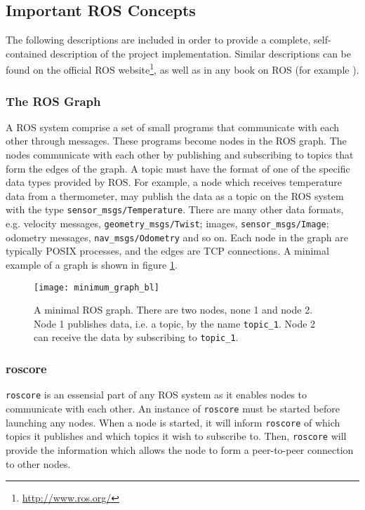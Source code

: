 \subsection{Important ROS Concepts}

The following descriptions are included in order to provide a complete, self-contained description of the project implementation. Similar descriptions can be found on the official \ac{ROS} website\footnote{\url{http://www.ros.org/}}, as well as in any book on \ac{ROS} (for example \cite{rosbook15}). 

\subsubsection{The ROS Graph}

A \ac{ROS} system comprise a set of small programs that communicate with each other through messages. These programs become nodes in the \ac{ROS} graph. The nodes communicate with each other by publishing and subscribing to topics that form the edges of the graph. A topic must have the format of one of the specific data types provided by \ac{ROS}. For example, a node which receives temperature data from a thermometer, may publish the data as a topic on the \ac{ROS} system with the type \texttt{sensor\_msgs/Temperature}. There are many other data formats, e.g. velocity messages, \texttt{geometry\_msgs/Twist}; images, \texttt{sensor\_msgs/Image}; odometry messages, \texttt{nav\_msgs/Odometry} and so on. Each node in the graph are typically POSIX processes, and the edges are TCP connections\cite{rosbook15}. A minimal example of a graph is shown in figure \ref{fig:minimum_graph}.

\begin{figure}[p]
    \centering
    \texttt{[image: minimum\_graph\_bl]}
    \caption{A minimal \ac{ROS} graph. There are two nodes, none 1 and node 2. Node 1 publishes data, i.e. a topic, by the name \texttt{topic\_1}. Node 2 can receive the data by subscribing to \texttt{topic\_1}.}
    \label{fig:minimum_graph}
\end{figure}

\subsubsection{roscore}

\texttt{roscore} is an essensial part of any \ac{ROS} system as it enables nodes to communicate with each other. An instance of \texttt{roscore} must be started before launching any nodes. When a node is started, it will inform \texttt{roscore} of which topics it publishes and which topics it wish to subscribe to. Then, \texttt{roscore} will provide the information which allows the node to form a peer-to-peer connection to other nodes.

